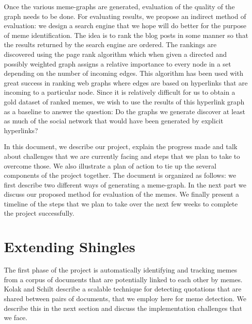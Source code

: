 \documentclass{acm_proc_article-sp}
\begin{document}
Once the various meme-graphs are generated, evaluation of the quality of the graph needs to be done. For evaluating results, we propose an indirect method of evaluation: we design a search engine that we hope will do better for the purpose of meme identification. The idea is to rank the blog posts in some manner so that the results returned by the search engine are ordered. The rankings are discovered using the page rank algorithm which when given a directed and possibly weighted graph assigns a relative importance to every node in a set depending on the number of incoming edges. This algorithm has been used with great success in ranking web graphs where edges are based on hyperlinks that are incoming to a particular node. Since it is relatively difficult for us to obtain a gold dataset of ranked memes, we wish to use  the results of this hyperlink graph as a baseline to answer the question: Do the graphs we generate discover at least as much of the social network that would have been generated by explicit hyperlinks?

In this document, we describe our project, explain the progress made and talk about challenges that we are currently facing and steps that we plan to take to overcome those. We also illustrate a plan of action to tie up the several components of the project together. The document is organized as follows: we first describe two different ways of generating a meme-graph. In the next part we discuss our proposed method for evaluation of the memes. We finally present a timeline of the steps that we plan to take over the next few weeks to complete the project successfully. 


\section{Extending Shingles}
The first phase of the project is automatically identifying and tracking memes from a corpus of documents that are potentially linked to each other by memes. Kolak and Schilt \cite{kolak2008generating} describe a scalable technique for detecting quotations that are shared between pairs of documents, that we employ here for meme detection. We describe this in the next section and discuss the implementation challenges that we face.
\end{document}
